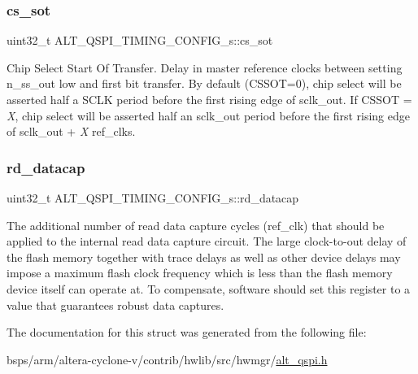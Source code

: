 \subsubsection{\texorpdfstring{cs\_sot}{cs\_sot}}
{\footnotesize\ttfamily uint32\+\_\+t A\+L\+T\+\_\+\+Q\+S\+P\+I\+\_\+\+T\+I\+M\+I\+N\+G\+\_\+\+C\+O\+N\+F\+I\+G\+\_\+s\+::cs\+\_\+sot}

Chip Select Start Of Transfer. Delay in master reference clocks between setting n\+\_\+ss\+\_\+out low and first bit transfer. By default (C\+S\+S\+OT=0), chip select will be asserted half a S\+C\+LK period before the first rising edge of sclk\+\_\+out. If C\+S\+S\+OT = {\itshape X}, chip select will be asserted half an sclk\+\_\+out period before the first rising edge of sclk\+\_\+out + {\itshape X} ref\+\_\+clks. \mbox{\label{structALT__QSPI__TIMING__CONFIG__s_ace43abd80a5630904de1b8665e226c5c}} 
\subsubsection{\texorpdfstring{rd\_datacap}{rd\_datacap}}
{\footnotesize\ttfamily uint32\+\_\+t A\+L\+T\+\_\+\+Q\+S\+P\+I\+\_\+\+T\+I\+M\+I\+N\+G\+\_\+\+C\+O\+N\+F\+I\+G\+\_\+s\+::rd\+\_\+datacap}

The additional number of read data capture cycles (ref\+\_\+clk) that should be applied to the internal read data capture circuit. The large clock-\/to-\/out delay of the flash memory together with trace delays as well as other device delays may impose a maximum flash clock frequency which is less than the flash memory device itself can operate at. To compensate, software should set this register to a value that guarantees robust data captures. 

The documentation for this struct was generated from the following file\+:\begin{DoxyCompactItemize}
\item 
bsps/arm/altera-\/cyclone-\/v/contrib/hwlib/src/hwmgr/\mbox{\hyperlink{contrib_2hwlib_2src_2hwmgr_2alt__qspi_8h}{alt\+\_\+qspi.\+h}}\end{DoxyCompactItemize}
